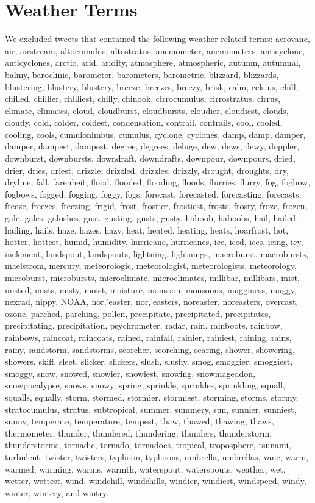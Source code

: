 \documentclass{article}
\begin{document}
\section{Weather Terms}
We excluded tweets that contained the following weather-related terms: aerovane, air, airstream, altocumulus, altostratus, anemometer, anemometers, anticyclone, anticyclones, arctic, arid, aridity, atmosphere, atmospheric, autumn, autumnal, balmy, baroclinic, barometer, barometers, barometric, blizzard, blizzards, blustering, blustery, blustery, breeze, breezes, breezy, brisk, calm, celsius, chill, chilled, chillier, chilliest, chilly, chinook, cirrocumulus, cirrostratus, cirrus, climate, climates, cloud, cloudburst, cloudbursts, cloudier, cloudiest, clouds, cloudy, cold, colder, coldest, condensation, contrail, contrails, cool, cooled, cooling, cools, cumulonimbus, cumulus, cyclone, cyclones, damp, damp, damper, damper, dampest, dampest, degree, degrees, deluge, dew, dews, dewy, doppler, downburst, downbursts, downdraft, downdrafts, downpour, downpours, dried, drier, dries, driest, drizzle, drizzled, drizzles, drizzly, drought, droughts, dry, dryline, fall, farenheit, flood, flooded, flooding, floods, flurries, flurry, fog, fogbow, fogbows, fogged, fogging, foggy, fogs, forecast, forecasted, forecasting, forecasts, freeze, freezes, freezing, frigid, frost, frostier, frostiest, frosts, frosty, froze, frozen, gale, gales, galoshes, gust, gusting, gusts, gusty, haboob, haboobs, hail, hailed, hailing, hails, haze, hazes, hazy, heat, heated, heating, heats, hoarfrost, hot, hotter, hottest, humid, humidity, hurricane, hurricanes, ice, iced, ices, icing, icy, inclement, landspout, landspouts, lightning, lightnings, macroburst, macrobursts, maelstrom, mercury, meteorologic, meteorologist, meteorologists, meteorology, microburst, microbursts, microclimate, microclimates, millibar, millibars, mist, misted, mists, misty, moist, moisture, monsoon, monsoons, mugginess, muggy, nexrad, nippy, NOAA, nor,’easter, nor,’easters, noreaster, noreasters, overcast, ozone, parched, parching, pollen, precipitate, precipitated, precipitates, precipitating, precipitation, psychrometer, radar, rain, rainboots, rainbow, rainbows, raincoat, raincoats, rained, rainfall, rainier, rainiest, raining, rains, rainy, sandstorm, sandstorms, scorcher, scorching, searing, shower, showering, showers, skiff, sleet, slicker, slickers, slush, slushy, smog, smoggier, smoggiest, smoggy, snow, snowed, snowier, snowiest, snowing, snowmageddon, snowpocalypse, snows, snowy, spring, sprinkle, sprinkles, sprinkling, squall, squalls, squally, storm, stormed, stormier, stormiest, storming, storms, stormy, stratocumulus, stratus, subtropical, summer, summery, sun, sunnier, sunniest, sunny, temperate, temperature, tempest, thaw, thawed, thawing, thaws, thermometer, thunder, thundered, thundering, thunders, thunderstorm, thunderstorms, tornadic, tornado, tornadoes, tropical, troposphere, tsunami, turbulent, twister, twisters, typhoon, typhoons, umbrella, umbrellas, vane, warm, warmed, warming, warms, warmth, waterspout, waterspouts, weather, wet, wetter, wettest, wind, windchill, windchills, windier, windiest, windspeed, windy, winter, wintery, and wintry.


\printbibliography
\end{document}
